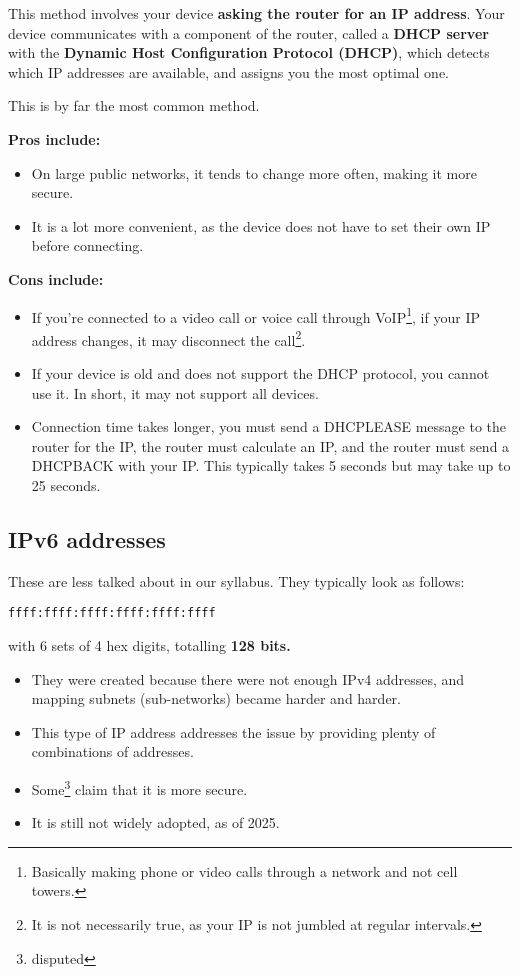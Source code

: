 \documentclass[../main.tex]{subfiles}
\begin{document}

This method involves your device \textbf{asking the router for an IP address}. Your device communicates with a component of the router, called a \textbf{DHCP server} with the \textbf{Dynamic Host Configuration Protocol (DHCP)}, which detects which IP addresses are available, and assigns you the most optimal one.

This is by far the most common method.

\textbf{Pros include:}
\begin{itemize}
    \item On large public networks, it tends to change more often, making it more secure.
    \item It is a lot more convenient, as the device does not have to set their own IP before connecting.
\end{itemize}

\textbf{Cons include:}
\begin{itemize}
    \item If you're connected to a video call or voice call through VoIP\footnote{Basically making phone or video calls through a network and not cell towers.}, if your IP address changes, it may disconnect the call\footnote{It is not necessarily true, as your IP is not jumbled at regular intervals.}.
    \item If your device is old and does not support the DHCP protocol, you cannot use it. In short, it may not support all devices.
    \item Connection time takes longer, you must send a {\mono DHCPLEASE} message to the router for the IP, the router must calculate an IP, and the router must send a {\mono DHCPBACK} with your IP. This typically takes 5 seconds but may take up to 25 seconds.
\end{itemize}

\subsection{IPv6 addresses}
\label{2:sec:ipv6}

These are less talked about in our syllabus. They typically look as follows:

\begin{verbatim}
ffff:ffff:ffff:ffff:ffff:ffff
\end{verbatim}

with 6 sets of 4 hex digits, totalling \textbf{128 bits.}

\begin{itemize}
    \item They were created because there were not enough IPv4 addresses, and mapping subnets (sub-networks) became harder and harder.
    \item This type of IP address addresses the issue by providing plenty of combinations of addresses.
    \item Some\footnote{disputed} claim that it is more secure.
    \item It is still not widely adopted, as of 2025.
\end{itemize}
\end{document}
